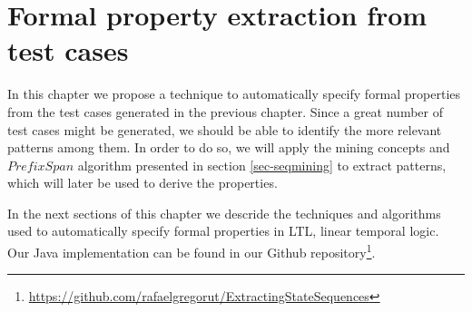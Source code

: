 \chapter{Formal property extraction from test cases}
\label{cap:propextract}

In this chapter we propose a technique to automatically specify formal properties from the test cases generated in the previous chapter. Since a great number of test cases might be generated, we should be able to identify the more relevant patterns among them. In order to do so, we will apply the mining concepts and $PrefixSpan$ algorithm presented in section \ref{sec-seqmining} to extract patterns, which will later be used to derive the properties.

In the next sections of this chapter we descride the techniques and algorithms used to automatically specify formal properties in LTL, linear temporal logic. Our Java implementation can be found in our Github repository\footnote{\url{https://github.com/rafaelgregorut/ExtractingStateSequences}}.



%


%








